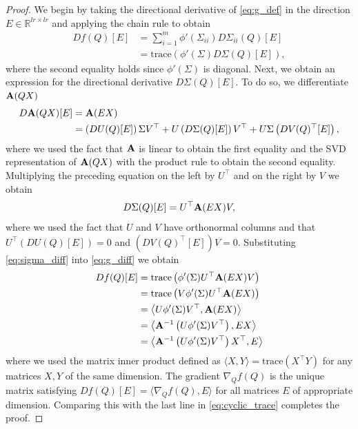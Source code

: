 \documentclass[pdflatex,sn-mathphys-num]{sn-jnl}
\newcommand{\bfA}[1]{{\textbf A}(#1)}
\begin{document}
\begin{proof}
   We begin by taking the directional derivative of \eqref{eq:g_def} in the direction $E \in \mathbb{R}^{lr \times lr}$ and applying the chain rule to obtain 
   \begin{equation} \label{eq:g_diff}
   \begin{aligned}
       Df(Q)[E] &= \sum_{i=1}^m \phi'\left(\Sigma_{ii}\right) D\Sigma_{ii}(Q)[E] \\
       &= \mbox{trace}\left(\phi'(\Sigma) D \Sigma(Q)[E]\right), 
   \end{aligned}
   \end{equation}
   where the second equality holds since $\phi'(\Sigma)$ is diagonal. 
   Next, we obtain an expression for the directional derivative $D\Sigma(Q)[E]$. To do so, we differentiate $\bfA{QX}$ 
   \begin{equation}
   \begin{aligned}
       D \bfA{QX}[E] &= \bfA{EX} \\
       &= \left(DU(Q)[E]\right) \Sigma V^{\top} + U \left(D\Sigma(Q)[E]\right) V^{\top} + U\Sigma \left(DV(Q)^{\top}[E]\right),
    \end{aligned}
   \end{equation}
   where we used the fact that ${\bf A}$ is linear to obtain the first equality and the SVD representation of $\bfA{QX}$ with the product rule to obtain the second equality. Multiplying the preceding equation on the left by $U^{\top}$ and on the right by $V$ we obtain 
   \begin{equation} \label{eq:sigma_diff}
    D \Sigma(Q)[E] = U^{\top} \bfA{EX} V,
   \end{equation}
   where we used the fact that $U$ and $V$ have orthonormal columns and that $U^{\top}\left(DU(Q)[E]\right) =0$ and $\left(DV(Q)^{\top}[E]\right)V=0$. 
   Substituting \eqref{eq:sigma_diff} into \eqref{eq:g_diff} we obtain 
   \begin{equation} \label{eq:cyclic_trace}
   \begin{aligned}
       Df(Q)[E] &= \mbox{trace}\left(\phi'(\Sigma) U^{\top} \bfA{EX}V\right) \\
       &= \mbox{trace}\left(V \phi'(\Sigma) U^{\top} \bfA{EX}\right) \\
       &= \left\langle U\phi'(\Sigma)V^{\top}, \bfA{EX} \right\rangle \\
       &= \left\langle {\bf A}^{-1}\left( U\phi'(\Sigma)V^{\top}\right), EX \right\rangle \\
       &= \left\langle {\bf A}^{-1}\left( U\phi'(\Sigma)V^{\top}\right)X^{\top}, E \right\rangle
    \end{aligned}
   \end{equation}
   where we used the matrix inner product defined as $\langle X,Y\rangle=\mbox{trace}(X^{\top}Y)$ for any matrices $X,Y$ of the same dimension. The gradient $\nabla_Q f(Q)$ is the unique matrix satisfying $Df(Q)[E] = \langle \nabla_Q f(Q),E\rangle$ for all matrices $E$ of appropriate dimension. Comparing this with the last line in \eqref{eq:cyclic_trace} completes the proof. 
\end{proof}
\end{document}
